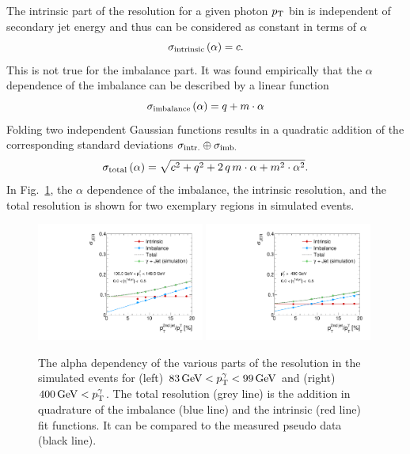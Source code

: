 The intrinsic part of the resolution for a given photon $p_{\text{T}}$ bin is independent of secondary jet energy and thus can be considered as constant in terms of $\alpha$
\begin{equation}\label{eq:intrinsic}
 \sigma_\mathrm{intrinsic} \left( \alpha\right) = c.
\end{equation}
This is not true for the imbalance part. It was found empirically that the $\alpha$ dependence of the imbalance can be described by a linear function 
\begin{equation}\label{eq:imbalance}
  \sigma_\mathrm{imbalance} \left( \alpha\right) = q + m \cdot \alpha
\end{equation}
Folding two independent Gaussian functions results in a quadratic addition of the corresponding standard deviations $\sigma_\mathrm{intr.}\oplus\sigma_\mathrm{imb.}$ 
\begin{equation}\label{eq:total}
  \sigma_\mathrm{total} \left( \alpha \right) = \sqrt{ c^2 + q^2  + 2\, q\, m \cdot \alpha +m^2 \cdot \alpha^2}. 
\end{equation}
In Fig.~\ref{fig:AlphaDependenceOfResolutions}, the $\alpha$ dependence of the imbalance, the intrinsic resolution, and the total resolution is shown for two exemplary \ptgamma regions in simulated events. 
\begin{figure}[!b]
 \centering
    \includegraphics[width=0.49\textwidth]{figures/resolution/methodology/JER_for_1_eta_bin_5_pTGamma_bin_wo_data_PFCHS_RMS99_mc.pdf} 
    \includegraphics[width=0.49\textwidth]{figures/resolution/methodology/JER_for_1_eta_bin_12_pTGamma_bin_wo_data_PFCHS_RMS99_mc.pdf} 
  \caption{The alpha dependency of the various parts of the resolution in the simulated events for (left) $83 \,\text{Ge}\kern-0.06667em\text{V} < p_{\text{T}}^{\gamma} < 99 \,\text{Ge}\kern-0.06667em\text{V} $ and (right) $400 \,\text{Ge}\kern-0.06667em\text{V} < p_{\text{T}}^{\gamma}$. 
           The total resolution (grey line) is the addition in quadrature of the imbalance (blue line) and the intrinsic (red line) 
  fit functions. It can 
  be compared to the measured pseudo data (black line).}  
 \label{fig:AlphaDependenceOfResolutions}
\end{figure}
